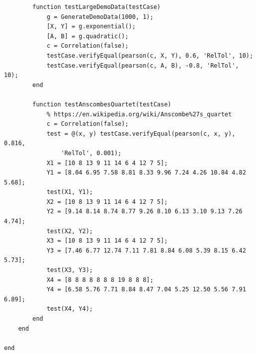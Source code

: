 \begin{verbatim}
        function testLargeDemoData(testCase)
            g = GenerateDemoData(1000, 1);
            [X, Y] = g.exponential();
            [A, B] = g.quadratic();
            c = Correlation(false);
            testCase.verifyEqual(pearson(c, X, Y), 0.6, 'RelTol', 10);
            testCase.verifyEqual(pearson(c, A, B), -0.8, 'RelTol', 10);
        end

        function testAnscombesQuartet(testCase)
            % https://en.wikipedia.org/wiki/Anscombe%27s_quartet
            c = Correlation(false);
            test = @(x, y) testCase.verifyEqual(pearson(c, x, y), 0.816,
                'RelTol', 0.001);
            X1 = [10 8 13 9 11 14 6 4 12 7 5];
            Y1 = [8.04 6.95 7.58 8.81 8.33 9.96 7.24 4.26 10.84 4.82 5.68];
            test(X1, Y1);
            X2 = [10 8 13 9 11 14 6 4 12 7 5];
            Y2 = [9.14 8.14 8.74 8.77 9.26 8.10 6.13 3.10 9.13 7.26 4.74];
            test(X2, Y2);
            X3 = [10 8 13 9 11 14 6 4 12 7 5];
            Y3 = [7.46 6.77 12.74 7.11 7.81 8.84 6.08 5.39 8.15 6.42 5.73];
            test(X3, Y3);
            X4 = [8 8 8 8 8 8 8 19 8 8 8];
            Y4 = [6.58 5.76 7.71 8.84 8.47 7.04 5.25 12.50 5.56 7.91 6.89];
            test(X4, Y4);
        end
    end

end
\end{verbatim}
